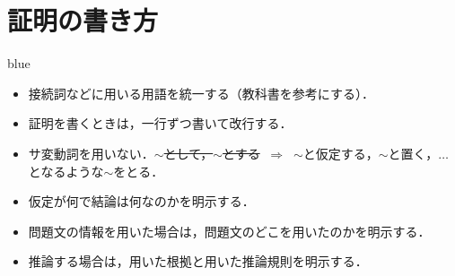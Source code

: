 \documentclass[11pt,dvipdfmx]{jreport}
\begin{document}
\section{証明の書き方}
\begin{color}{blue}
\begin{itemize}
 \item 接続詞などに用いる用語を統一する（教科書を参考にする）．
 \item 証明を書くときは，一行ずつ書いて改行する．
 \item サ変動詞を用いない．\sout{$\sim$として，$\sim$とする} $\ \Longrightarrow \ $ $\sim$と仮定する，$\sim$と置く，$\dots$となるような$\sim$をとる．
 \item 仮定が何で結論は何なのかを明示する．
 \item 問題文の情報を用いた場合は，問題文のどこを用いたのかを明示する．
 \item 推論する場合は，用いた根拠と用いた推論規則を明示する．
\end{itemize}
\end{color}


\end{document}

